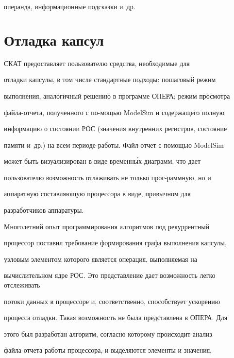 операнда, информационные подсказки и~др. 





\section{Отладка капсул}


      


СКАТ предоставляет пользователю средства, необходимые для 


отладки капсулы, в том числе стандартные подходы: пошаговый режим 


выполнения, аналогичный решению в программе ОПЕРА; режим просмотра 


фай\-ла-от\-че\-та, полученного с по-\linebreak мощью ModelSim и содержащего полную 


информацию о состоянии РОС (значения внутренних регистров, состояние 


памяти и~др.) на всем периоде работы. Файл-от\-чет с помощью \mbox{ModelSim} 


может быть визуализирован в виде временн\'{ы}х диаграмм, что дает 


пользователю возможность отлаживать не только прог-\linebreak раммную, но и 


аппаратную составляющую процессора в виде, привычном для 


разработчиков аппаратуры.


      


      Многолетний опыт программирования алгоритмов под рекуррентный 


процессор поставил требование формирования гра\-фа выполнения капсулы, 


узловым элементом которого является операция, выполняемая на 


вычислительном ядре РОС. Это представление дает возможность легко отслеживать 


потоки данных в процессоре и, соответственно, способствует ускорению 


процесса отладки. Такая возможность не была представлена в ОПЕРА. Для 


этого был разработан алгоритм, согласно которому происходит анализ 


фай\-ла-от\-че\-та работы процессора, и выделяются элементы и значения, 



